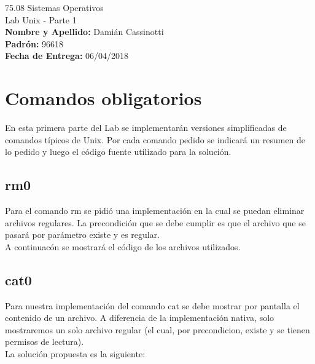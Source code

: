 \documentclass[a4paper, 12pt]{article}
\begin{document}
		
	\begin{titlepage}
		\vspace*{\fill}
		\begin{center}
			\Large 75.08 Sistemas Operativos \\
			\Huge Lab Unix - Parte 1 \\
			\bigskip\bigskip\bigskip
			\large\textbf{Nombre y Apellido:} Damián Cassinotti \\
			\textbf{Padrón:} 96618 \\
			\textbf{Fecha de Entrega:} 06/04/2018\\
					
		\end{center}
		\vspace*{\fill}
	\end{titlepage}
	\pagenumbering{arabic}
	\newpage
			
	\tableofcontents
	\newpage
	
	\section{Comandos obligatorios}
		En esta primera parte del Lab se implementarán versiones simplificadas de comandos típicos de Unix. Por cada comando pedido se indicará un resumen de lo pedido y luego el código fuente utilizado para la solución.
		\subsection{rm0}
		Para el comando rm se pidió una implementación en la cual se puedan eliminar archivos regulares. La precondición que se debe cumplir es que el archivo que se pasará por parámetro existe y es regular.\\
		A continuacón se mostrará el código de los archivos utilizados.
		
		\bigskip\bigskip\bigskip
		
		
		\subsection{cat0}
		Para nuestra implementación del comando cat se debe mostrar por pantalla el contenido de un archivo. A diferencia de la implementación nativa, solo mostraremos un solo archivo regular (el cual, por precondicion, existe y se tienen permisos de lectura).\\
		La solución propuesta es la siguiente: 
		
		\bigskip\bigskip\bigskip
		
	
\end{document}
